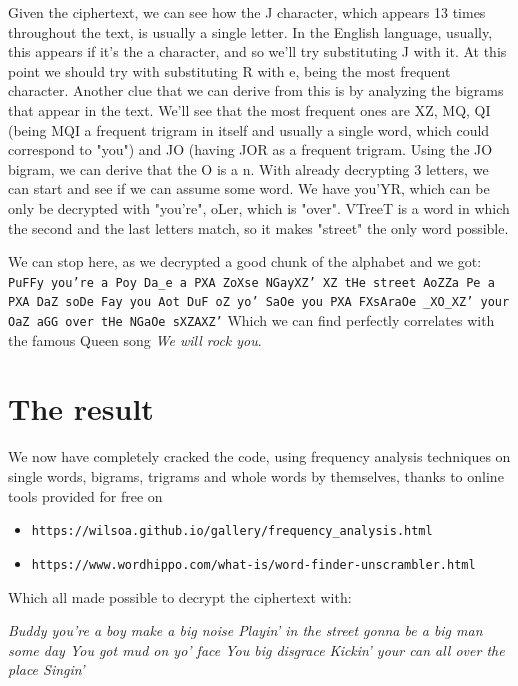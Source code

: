 \documentclass{article}
\begin{document}
Given the ciphertext, we can see how the J character, which appears 13 times throughout the text, is usually a single letter. In the English language, usually, this appears if it's the a character, and so we'll try substituting J with it. At this point we should try with substituting R with e, being the most frequent character.
Another clue that we can derive from this is by analyzing the bigrams that appear in the text. We'll see that the most frequent ones are XZ, MQ, QI (being MQI a frequent trigram in itself and usually a single word, which could correspond to "you") and JO (having JOR as a frequent trigram. Using the JO bigram, we can derive that the O is a n. With already decrypting 3 letters, we can start and see if we can assume some word. We have you'YR, which can be only be decrypted with "you're", oLer, which is "over". VTreeT is a word in which the second and the last letters match, so it makes "street" the only word possible.

We can stop here, as we decrypted a good chunk of the alphabet and we got:
\texttt{PuFFy you're a Poy Da\_e a PXA ZoXse NGayXZ' XZ tHe street AoZZa Pe a PXA DaZ soDe Fay you Aot DuF oZ yo' SaOe you PXA FXsAraOe \_XO\_XZ' your OaZ aGG over tHe NGaOe sXZAXZ'}
Which we can find perfectly correlates with the famous Queen song \emph{We will rock you}.

\section{The result}
We now have completely cracked the code, using frequency analysis techniques on single words, bigrams, trigrams and whole words by themselves, thanks to online tools provided for free on 
\begin{itemize}
    \item \texttt{https://wilsoa.github.io/gallery/frequency\_analysis.html}
    \item \texttt{https://www.wordhippo.com/what-is/word-finder-unscrambler.html}
\end{itemize}

Which all made possible to decrypt the ciphertext with:
\begin{center}
\emph{Buddy you're a boy make a big noise
Playin' in the street gonna be a big man some day
You got mud on yo' face
You big disgrace
Kickin' your can all over the place
Singin'}
\end{center}
\end{document}
